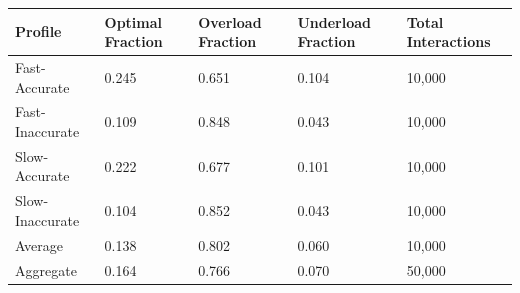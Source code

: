\begin{table}[ht]
\centering
\begin{tabular}{lllll}
\toprule
Profile & Optimal Fraction & Overload Fraction & Underload Fraction & Total Interactions \\
\midrule
Fast-Accurate & 0.245 & 0.651 & 0.104 & 10,000 \\
Fast-Inaccurate & 0.109 & 0.848 & 0.043 & 10,000 \\
Slow-Accurate & 0.222 & 0.677 & 0.101 & 10,000 \\
Slow-Inaccurate & 0.104 & 0.852 & 0.043 & 10,000 \\
Average & 0.138 & 0.802 & 0.060 & 10,000 \\
Aggregate & 0.164 & 0.766 & 0.070 & 50,000 \\
\bottomrule
\end{tabular}
\end{table}